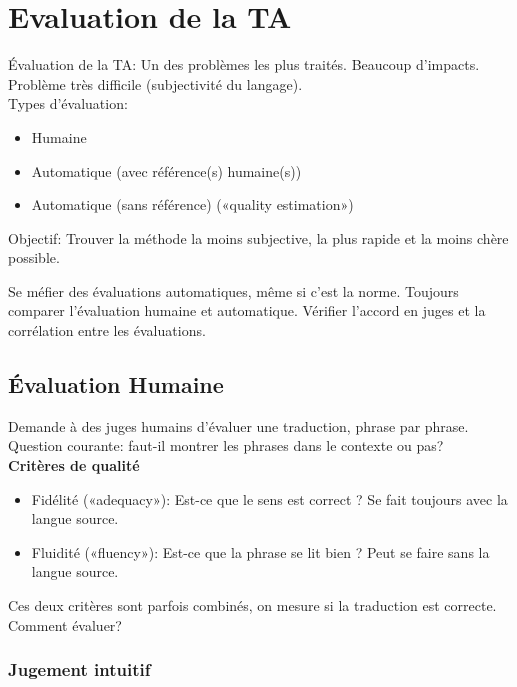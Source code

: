 \vspace{-1.2cm}

\section{Evaluation de la TA}

Évaluation de la TA: Un des problèmes les plus traités. Beaucoup d’impacts. Problème très difficile (subjectivité du langage).\\

Types d’évaluation:

\begin{itemize}
    \item Humaine
    \item Automatique (avec référence(s) humaine(s))
    \item Automatique (sans référence) («quality estimation»)\\
\end{itemize}

Objectif: Trouver la méthode la moins subjective, la plus rapide et la moins chère possible.

Se méfier des évaluations automatiques, même si c’est la norme. Toujours comparer l’évaluation humaine et automatique. Vérifier l’accord en juges et la corrélation entre les évaluations.

\subsection{Évaluation Humaine}

Demande à des juges humains d’évaluer une traduction, phrase par phrase. Question courante: faut-il montrer les phrases dans le contexte ou pas?\\

\textbf{Critères de qualité}

\begin{itemize}
    \item Fidélité («adequacy»): Est-ce que le sens est correct ? Se fait toujours avec la langue source.
    \item Fluidité («fluency»): Est-ce que la phrase se lit bien ? Peut se faire sans la langue source. \\
\end{itemize}

Ces deux critères sont parfois combinés, on mesure si la traduction est correcte. Comment évaluer?

\subsubsection{Jugement intuitif}

